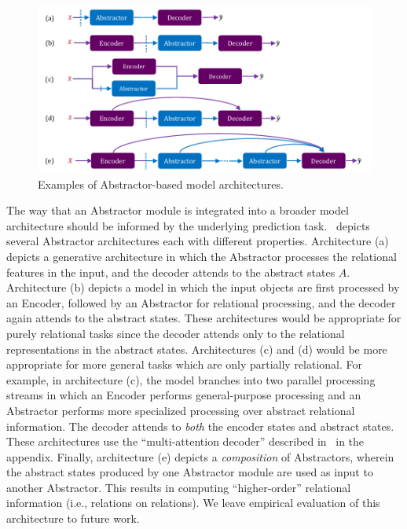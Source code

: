 \begin{figure}
    \centering
    \includegraphics[width=.8\textwidth]{figures/abstractor_architectures.pdf}
    \caption{Examples of Abstractor-based model architectures.}
    \label{fig:abstractor_architectures}
\end{figure}


The way that an Abstractor module is integrated into a broader model architecture should be informed by the underlying prediction task.~ depicts several Abstractor architectures each with different properties. Architecture (a) depicts a generative architecture in which the Abstractor processes the relational features in the input, and the decoder attends to the abstract states $A$. Architecture (b) depicts a model in which the input objects are first processed by an Encoder, followed by an Abstractor for relational processing, and the decoder again attends to the abstract states. These architectures would be appropriate for purely relational tasks since the decoder attends only to the relational representations in the abstract states. Architectures (c) and (d) would be more appropriate for more general tasks which are only partially relational. For example, in architecture (c), the model branches into two parallel processing streams in which an Encoder performs general-purpose processing and an Abstractor performs more specialized processing over abstract relational information.
The decoder attends to \textit{both} the encoder states and abstract states.
These architectures use the ``multi-attention decoder'' described in~ in the appendix.
Finally, architecture (e) depicts a \textit{composition} of Abstractors, wherein the abstract states produced by one Abstractor module are used as input to another Abstractor. This results in computing ``higher-order'' relational information (i.e., relations on relations).
We leave empirical evaluation of this architecture to future work. 